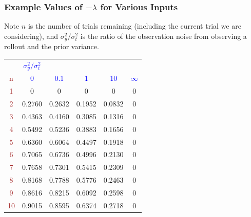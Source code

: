 \documentclass[a4paper,10pt]{article}
\newcommand{\brown}[1]{\textcolor{brown}{#1}}
\newcommand{\blue}[1]{\textcolor{blue}{#1}}
\begin{document}
\subsubsection{Example Values of $-\lambda$ for Various Inputs} 

Note $n$ is the number of trials remaining (including the current trial we are considering),
and $\sigma^2_y / \sigma_t^2$ is the ratio of the observation noise from observing a rollout and the 
prior variance.

\begin{tabular}{ c | c c c c c }
   &       \blue{$\sigma^2_y / \sigma_t^2$} &        &        &        \\
\brown{n}  &       \blue{0} &       \blue{0.1} &       \blue{1} &       \blue{10} & \blue{$\infty$} \\
\hline
\brown{1 } &      0 &      0 &      0 &      0 & 0 \\
\brown{2 } & 0.2760 & 0.2632 & 0.1952 & 0.0832 & 0 \\
\brown{3 } & 0.4363 & 0.4160 & 0.3085 & 0.1316 & 0 \\
\brown{4 } & 0.5492 & 0.5236 & 0.3883 & 0.1656 & 0 \\
\brown{5 } & 0.6360 & 0.6064 & 0.4497 & 0.1918 & 0 \\
\brown{6 } & 0.7065 & 0.6736 & 0.4996 & 0.2130 & 0 \\
\brown{7 } & 0.7658 & 0.7301 & 0.5415 & 0.2309 & 0 \\
\brown{8 } & 0.8168 & 0.7788 & 0.5776 & 0.2463 & 0 \\
\brown{9 } & 0.8616 & 0.8215 & 0.6092 & 0.2598 & 0 \\
\brown{10} & 0.9015 & 0.8595 & 0.6374 & 0.2718 & 0 \\
\end{tabular}
\end{document}
